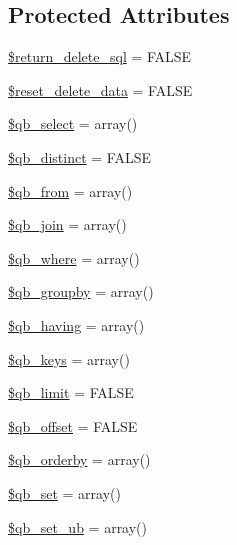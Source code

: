 \subsection*{Protected Attributes}
\begin{DoxyCompactItemize}
\item 
\mbox{\hyperlink{class_c_i___d_b__query__builder_aee0c1cc88062e1b49fe9e057bfb288e6}{\$return\+\_\+delete\+\_\+sql}} = F\+A\+L\+SE
\item 
\mbox{\hyperlink{class_c_i___d_b__query__builder_aaeed877e8b1faeddaecaec6c890567ef}{\$reset\+\_\+delete\+\_\+data}} = F\+A\+L\+SE
\item 
\mbox{\hyperlink{class_c_i___d_b__query__builder_a0ffc5292702e6f9ffbd830f149762e87}{\$qb\+\_\+select}} = array()
\item 
\mbox{\hyperlink{class_c_i___d_b__query__builder_ab25ffde080220f90531e2c7fb63dae61}{\$qb\+\_\+distinct}} = F\+A\+L\+SE
\item 
\mbox{\hyperlink{class_c_i___d_b__query__builder_ae3b7c9b5e80df14e86603e12e5af7878}{\$qb\+\_\+from}} = array()
\item 
\mbox{\hyperlink{class_c_i___d_b__query__builder_a21c59bf512aeedb532e61ef101aefc17}{\$qb\+\_\+join}} = array()
\item 
\mbox{\hyperlink{class_c_i___d_b__query__builder_afc34268c5a4d034aa3802e3310ec9419}{\$qb\+\_\+where}} = array()
\item 
\mbox{\hyperlink{class_c_i___d_b__query__builder_a93e14f322d0e6e6cbc3eebe21ce6a034}{\$qb\+\_\+groupby}} = array()
\item 
\mbox{\hyperlink{class_c_i___d_b__query__builder_a3f6570da7e71b44280a01265f18e1a54}{\$qb\+\_\+having}} = array()
\item 
\mbox{\hyperlink{class_c_i___d_b__query__builder_a08fe63db41a3e804650206850175c1dc}{\$qb\+\_\+keys}} = array()
\item 
\mbox{\hyperlink{class_c_i___d_b__query__builder_a383e4f5a10c762a271105c85b3ebca61}{\$qb\+\_\+limit}} = F\+A\+L\+SE
\item 
\mbox{\hyperlink{class_c_i___d_b__query__builder_aa45418e873986d0f6e6bc768ea5567e5}{\$qb\+\_\+offset}} = F\+A\+L\+SE
\item 
\mbox{\hyperlink{class_c_i___d_b__query__builder_a8e856c95a5ca3df7c7deba3782182a3e}{\$qb\+\_\+orderby}} = array()
\item 
\mbox{\hyperlink{class_c_i___d_b__query__builder_a377913806717a7b6bcd35ed1df5ac072}{\$qb\+\_\+set}} = array()
\item 
\mbox{\hyperlink{class_c_i___d_b__query__builder_af816caafbd6c91c12d1cf7b39ad9de35}{\$qb\+\_\+set\+\_\+ub}} = array()

\end{DoxyCompactItemize}
